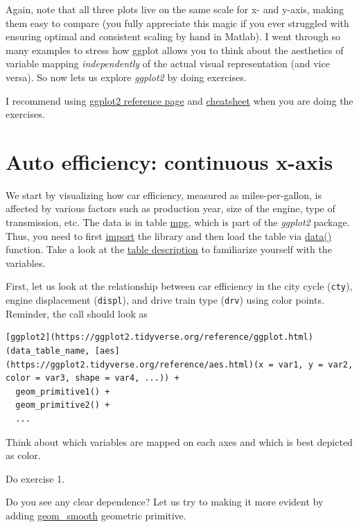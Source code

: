 \documentclass[
]{book}
\begin{document}
Again, note that all three plots live on the same scale for x- and y-axis, making them easy to compare (you fully appreciate this magic if you ever struggled with ensuring optimal and consistent scaling by hand in Matlab). I went through so many examples to stress how ggplot allows you to think about the aesthetics of variable mapping \emph{independently} of the actual visual representation (and vice versa). So now lets us explore \emph{ggplot2} by doing exercises.

I recommend using \href{https://ggplot2.tidyverse.org/}{ggplot2 reference page} and \href{https://github.com/rstudio/cheatsheets/raw/master/data-visualization-2.1.pdf}{cheatsheet} when you are doing the exercises.

\hypertarget{auto-efficiency-continuous-x-axis}{%
\section{Auto efficiency: continuous x-axis}\label{auto-efficiency-continuous-x-axis}}

We start by visualizing how car efficiency, measured as miles-per-gallon, is affected by various factors such as production year, size of the engine, type of transmission, etc. The data is in table \href{https://ggplot2.tidyverse.org/reference/mpg.html}{mpg}, which is part of the \emph{ggplot2} package. Thus, you need to first \protect\hyperlink{library}{import} the library and then load the table via \protect\hyperlink{data}{data()} function. Take a look at the \href{https://ggplot2.tidyverse.org/reference/mpg.html}{table description} to familiarize yourself with the variables.

First, let us look at the relationship between car efficiency in the city cycle (\texttt{cty}), engine displacement (\texttt{displ}), and drive train type (\texttt{drv}) using color points. Reminder, the call should look as

\begin{verbatim}
[ggplot2](https://ggplot2.tidyverse.org/reference/ggplot.html)(data_table_name, [aes](https://ggplot2.tidyverse.org/reference/aes.html)(x = var1, y = var2, color = var3, shape = var4, ...)) + 
  geom_primitive1() + 
  geom_primitive2() +
  ...
\end{verbatim}

Think about which variables are mapped on each axes and which is best depicted as color.

Do exercise 1.

Do you see any clear dependence? Let us try to making it more evident by adding \href{https://ggplot2.tidyverse.org/reference/geom_smooth.html}{geom\_smooth} geometric primitive.
\end{document}
